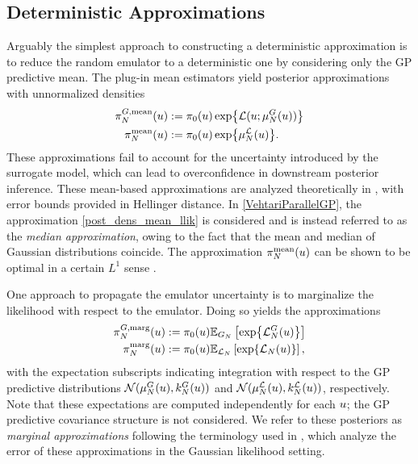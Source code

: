 \documentclass[12pt]{article}
\begin{document}
\subsection{Deterministic Approximations}
Arguably the simplest approach to constructing a deterministic approximation is to reduce the random emulator 
to a deterministic one by considering only the GP predictive mean. 
The plug-in mean estimators yield posterior approximations with unnormalized densities 
\begin{align}
\fwdEmMeanDens[\Ndesign](\Par) &:= \priorDens(\Par) \Exp{\llik(\Par; \emMean[\Ndesign]{\fwd}(\Par))}
 \label{post_dens_mean_fwd} \\
\llikEmMeanDens[\Ndesign](\Par) &:= \priorDens(\Par) \Exp{\emMean[\Ndesign]{\llik}(\Par)} 
\label{post_dens_mean_llik}.
\end{align}
These approximations fail to account for the uncertainty introduced by the surrogate model, which can lead 
to overconfidence in downstream posterior inference. These mean-based approximations are analyzed 
theoretically in \cite{StuartTeck1}, with error bounds provided in Hellinger distance. In \ref{VehtariParallelGP}, 
the approximation \ref{post_dens_mean_llik} is considered and is instead referred to as the 
\textit{median approximation}, owing to the fact that the mean and median of Gaussian distributions coincide. 
The approximation $\llikEmMeanDens[\Ndesign](\Par)$ can be shown to be optimal in a certain  
$L^1$ sense \cite{VehtariParallelGP, StuartTeck2}. 

One approach to propagate the 
emulator uncertainty is to marginalize the likelihood with respect to the emulator. Doing so yields the approximations 
\begin{align}
\fwdEmMargDens[\Ndesign](\Par) &:= \priorDens(\Par) \E_{\fwdEm}\left[\Exp{\llikEmFwd[\Ndesign](\Par)} \right] \label{post_dens_marg_fwd} \\
\llikEmMargDens[\Ndesign](\Par) &:= \priorDens(\Par) \E_{\llikEm}\left[\Exp{\llikEm[\Ndesign](\Par)} \right], \label{post_dens_marg_llik}
\end{align}
with the expectation subscripts indicating integration with respect to the GP predictive distributions 
$\Gaussian(\emMean[\Ndesign]{\fwd}(\Par), \emKer[\Ndesign]{\fwd}(\Par))$ and
$\Gaussian(\emMean[\Ndesign]{\llik}(\Par), \emKer[\Ndesign]{\llik}(\Par))$, respectively. Note that these expectations are 
computed independently for each $\Par$; the GP predictive covariance structure is not considered. 
We refer to these posteriors as \textit{marginal approximations} following the terminology used in
 \cite{StuartTeck1, StuartTeck2}, which analyze the error of these approximations in the Gaussian likelihood setting. 
\end{document}
